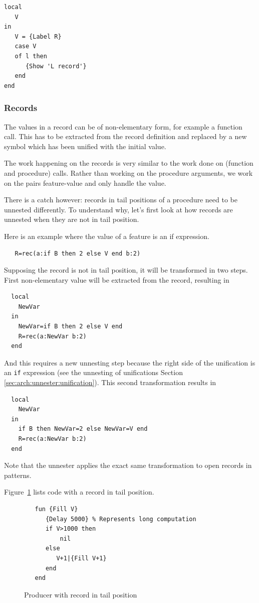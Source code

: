 \documentclass[a4paper]{memoir}
\begin{document}
\begin{lstlisting}
local
   V
in
   V = {Label R}
   case V 
   of l then
      {Show 'L record'}
   end
end
\end{lstlisting}
   

\subsubsection{Records}\label{sec:arch:unnester:records}
The values in a record can be of non-elementary form, for example a function call. This has to be extracted from the record definition and replaced by a new symbol which has been unified with the initial value. 

The work happening on the records is very similar to the work done on (function and procedure) calls. Rather than working on the procedure arguments, we work on the pairs feature-value and only handle the value. 

There is a catch however: records in tail positions of a procedure need to be unnested
differently. To understand why, let's first look at how records are unnested
when they are not in tail position.

Here is an example where the value of a feature is an if expression.
\begin{lstlisting}
   R=rec(a:if B then 2 else V end b:2)
\end{lstlisting}
Supposing the record is not in tail position, it will be transformed in two steps.
First non-elementary value will be extracted from the record, resulting in 
\begin{lstlisting}
  local
    NewVar
  in
    NewVar=if B then 2 else V end
    R=rec(a:NewVar b:2)
  end
\end{lstlisting}
And this requires a new unnesting step because the right side of the unification is an \lstinline!if! expression (see the unnesting of unifications Section \ref{sec:arch:unnester:unification}).
\pagebreak[4]
This second transformation results in 
\begin{lstlisting}
  local
    NewVar
  in
    if B then NewVar=2 else NewVar=V end
    R=rec(a:NewVar b:2)
  end
\end{lstlisting}

Note that the unnester applies the exact same transformation to open records in
patterns.



Figure~\ref{fig:unnester:fill_tail} lists code with a record in tail position.

\begin{figure}[h]
\begin{lstlisting}
   fun {Fill V}
      {Delay 5000} % Represents long computation
      if V>1000 then
	      nil
      else
         V+1|{Fill V+1}
      end
   end
\end{lstlisting}
\caption{Producer with record in tail position}
\label{fig:unnester:fill_tail}
\end{figure}
\end{document}
